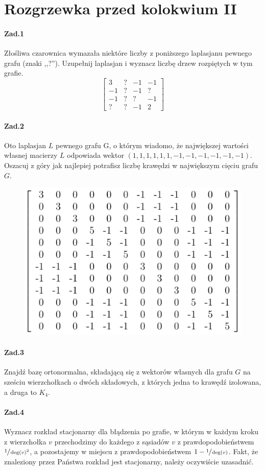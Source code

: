 \section{Rozgrzewka przed kolokwium II}
\paragraph{Zad.1} Złośliwa czarownica wymazała niektóre liczby z poniższego laplasjanu pewnego grafu (znaki ,,?''). Uzupełnij laplasjan i wyznacz liczbę drzew rozpiętych w tym grafie.
$$\begin{bmatrix}
3& ?& -1& -1\\
-1& ?& -1& ?\\
-1& ?& ?& -1\\
?& ?& -1& 2
\end{bmatrix}$$

\paragraph{Zad.2} Oto laplasjan $L$ pewnego grafu G, o którym wiadomo, że największej wartości własnej macierzy $L$ odpowiada wektor $(1, 1, 1, 1, 1, 1, -1, -1, -1, -1, -1, -1)$. Oszacuj z góry jak najlepiej potrafisz liczbę krawędzi w największym cięciu grafu $G$.

\begin{figure}[H]
\centering
\includegraphics[width=.6\textwidth]{img/ROZ_2_2}
\end{figure}

\paragraph{Zad.3} Znajdź bazę ortonormalna, składającą się z wektorów własnych dla grafu $G$ na sześciu wierzchołkach o dwóch składowych, z których jedna to krawędź izolowana, a druga to $K_4$.

\paragraph{Zad.4} Wyznacz rozkład stacjonarny dla błądzenia po grafie, w którym w każdym kroku z wierzchołka $v$ przechodzimy do każdego z sąsiadów $v$ z prawdopodobieństwem $\sfrac{1}{\deg  (v)^2}$, a pozostajemy w miejscu z prawdopodobieństwem $1 - \sfrac{1}{\deg (v)}$. Fakt, że znaleziony przez Państwa rozkład jest stacjonarny, należy oczywiście uzasadnić.

